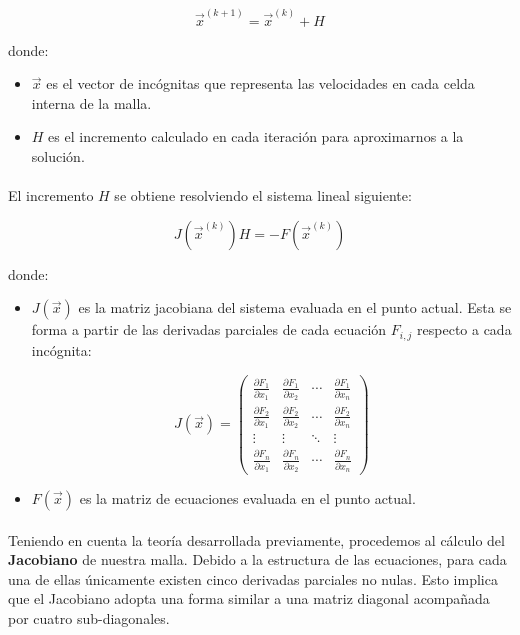 \documentclass{article}
\begin{document}
  \[
  \vec{x}^{(k+1)} = \vec{x}^{(k)} + H
  \]

  donde:
  \begin{itemize}
    \item \(\vec{x}\) es el vector de incógnitas que representa las velocidades en cada celda interna de la malla.
    \item \(H\) es el incremento calculado en cada iteración para aproximarnos a la solución.
  \end{itemize}

  \paragraph{}
  El incremento \(H\) se obtiene resolviendo el sistema lineal siguiente:

  \[
  J(\vec{x}^{(k)}) H = -F(\vec{x}^{(k)})
  \]

  donde:
  \begin{itemize}
    \item \(J(\vec{x})\) es la matriz jacobiana del sistema evaluada en el punto actual. Esta se forma a partir de las derivadas parciales de cada ecuación \(F_{i,j}\) respecto a cada incógnita:
      
    \[
    J(\vec{x}) = 
    \begin{pmatrix} 
    \frac{\partial F_1}{\partial x_1} & \frac{\partial F_1}{\partial x_2} & \cdots & \frac{\partial F_1}{\partial x_n} \\ 
    \frac{\partial F_2}{\partial x_1} & \frac{\partial F_2}{\partial x_2} & \cdots & \frac{\partial F_2}{\partial x_n} \\ 
    \vdots & \vdots & \ddots & \vdots \\ 
    \frac{\partial F_n}{\partial x_1} & \frac{\partial F_n}{\partial x_2} & \cdots & \frac{\partial F_n}{\partial x_n}
    \end{pmatrix}
    \]

    \item \(F(\vec{x})\) es la matriz de ecuaciones evaluada en el punto actual.
  \end{itemize}

  \paragraph{}
  Teniendo en cuenta la teoría desarrollada previamente, procedemos al cálculo del \textbf{Jacobiano} de nuestra malla. Debido a la estructura de las ecuaciones, para cada una de ellas únicamente existen cinco derivadas parciales no nulas. Esto implica que el Jacobiano adopta una forma similar a una matriz diagonal acompañada por cuatro sub-diagonales.
\end{document}
